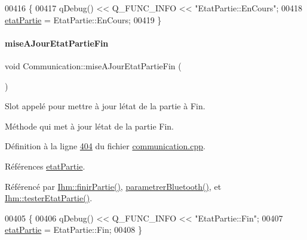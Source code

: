 \begin{DoxyCode}
00416 \{
00417     qDebug() << Q\_FUNC\_INFO << \textcolor{stringliteral}{"EtatPartie::EnCours"};
00418     \hyperlink{class_communication_a2539ded2780db2c732690c585c768c96}{etatPartie} = EtatPartie::EnCours;
00419 \}
\end{DoxyCode}
\mbox{\label{class_communication_af6b9f4bf3b1df197ce20dccd9b78663f}} 
\paragraph{\texorpdfstring{mise\+A\+Jour\+Etat\+Partie\+Fin}{miseAJourEtatPartieFin}}
{\footnotesize\ttfamily void Communication\+::mise\+A\+Jour\+Etat\+Partie\+Fin (\begin{DoxyParamCaption}{ }\end{DoxyParamCaption})\hspace{0.3cm}{\ttfamily [slot]}}



Slot appelé pour mettre à jour l\textquotesingle{}état de la partie à Fin. 

Méthode qui met à jour l\textquotesingle{}état de la partie Fin. 

Définition à la ligne \hyperlink{communication_8cpp_source_l00404}{404} du fichier \hyperlink{communication_8cpp_source}{communication.\+cpp}.



Références \hyperlink{communication_8h_source_l00100}{etat\+Partie}.



Référencé par \hyperlink{ihm_8cpp_source_l00365}{Ihm\+::finir\+Partie()}, \hyperlink{communication_8cpp_source_l00059}{parametrer\+Bluetooth()}, et \hyperlink{ihm_8cpp_source_l00641}{Ihm\+::tester\+Etat\+Partie()}.


\begin{DoxyCode}
00405 \{
00406     qDebug() << Q\_FUNC\_INFO << \textcolor{stringliteral}{"EtatPartie::Fin"};
00407     \hyperlink{class_communication_a2539ded2780db2c732690c585c768c96}{etatPartie} = EtatPartie::Fin;
00408 \}
\end{DoxyCode}
\mbox{\label{class_communication_aaf8fbed545d460414fda14f23d5dca5d}} 
